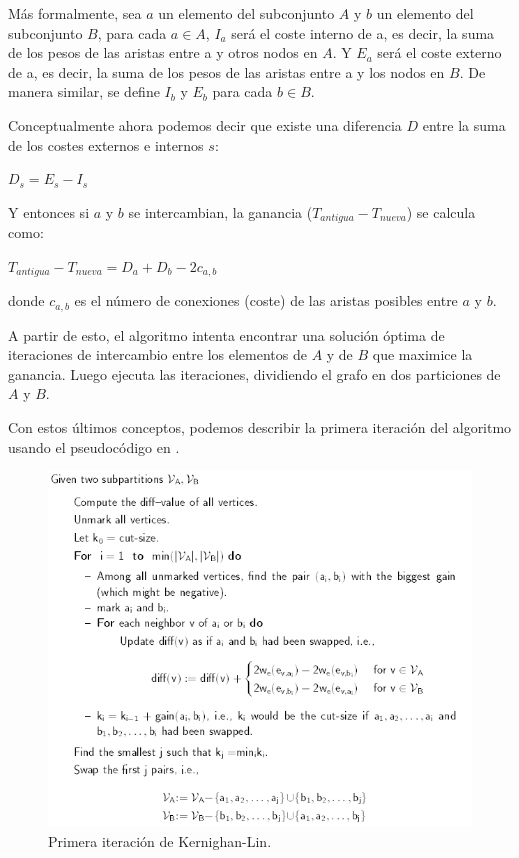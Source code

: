 Más formalmente, sea $a$ un elemento del subconjunto $A$ y $b$ un elemento del subconjunto $B$, para cada $a \in A$, $I_{a}$ será el coste interno de a, es decir, la suma de los pesos de las aristas entre a y otros nodos en $A$. Y $E_{a}$ será el coste externo de a, es decir, la suma de los pesos de las aristas entre a y los nodos en $B$. De manera similar, se define $I_{b}$ y $E_{b}$ para cada $b \in B$.

\newpage
Conceptualmente ahora podemos decir que existe una diferencia $D$ entre la suma de los costes externos e internos $s$:

\begin{center}
	$D_{s} = E_{s} - I_{s}$
\end{center}

Y entonces si $a$ y $b$ se intercambian, la ganancia ($T_{antigua} - T_{nueva}$) se calcula como:

\begin{center}\label{ganancia}
	$T_{antigua} - T_{nueva} = D_{a} + D_{b} - 2c_{a, b}$ 
\end{center}

donde $c_{a, b}$ es el número de conexiones (coste) de las aristas posibles entre $a$ y $b$.

A partir de esto, el algoritmo intenta encontrar una solución óptima de iteraciones de intercambio entre los elementos de $A$ y de $B$ que maximice la ganancia. Luego ejecuta las iteraciones, dividiendo el grafo en dos particiones de $A$ y $B$.

Con estos últimos conceptos, podemos describir la primera iteración del algoritmo usando el pseudocódigo en \cite{Ravikumar}.

\begin{figure}[h]
	\centering
	\includegraphics[scale=0.8]{Figures/kl_pseudocode}
	\vspace{1mm}
	\caption{Primera iteración de Kernighan-Lin.}
	\label{kl_pseudocode}
\end{figure}

